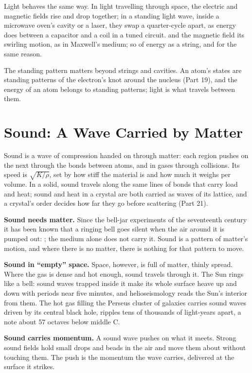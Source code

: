 Light behaves the same way. In light travelling through space, the electric and magnetic fields rise and drop together; in a standing light wave, inside a microwave oven's cavity or a laser, they swap a quarter-cycle apart, as energy does between a capacitor and a coil in a tuned circuit.  and the magnetic field its swirling motion, as in Maxwell's medium; so  of energy as a string, and for the same reason.

The standing pattern matters beyond strings and cavities. An atom's states are standing patterns of the electron's knot around the nucleus (Part 19), and the energy of an atom belongs to standing patterns; light is what travels between them.

\section{Sound: A Wave Carried by Matter}

Sound is a wave of compression handed on through matter: each region pushes on the next through the bonds between atoms, and in gases through collisions. Its speed is $\sqrt{K/\rho}$, set by how stiff the material is and how much it weighs per volume. In a solid, sound travels along the same lines of bonds that carry load and heat; sound and heat in a crystal are both carried as waves of its lattice, and a crystal's order decides how far they go before scattering (Part 21).

\textbf{Sound needs matter.} Since the bell-jar experiments of the seventeenth century it has been known that a ringing bell goes silent when the air around it is pumped out: ; the medium alone does not carry it. Sound is a pattern of matter's motion, and where there is no matter, there is nothing for that pattern to move.

\textbf{Sound in ``empty'' space.} Space, however, is full of matter, thinly spread. Where the gas is dense and hot enough, sound travels through it. The Sun rings like a bell: sound waves trapped inside it make its whole surface heave up and down with periods near five minutes, and helioseismology reads the Sun's interior from them. The hot gas filling the Perseus cluster of galaxies carries sound waves driven by its central black hole, ripples tens of thousands of light-years apart, a note about 57 octaves below middle C.

\textbf{Sound carries momentum.} A sound wave pushes on what it meets. Strong sound fields hold small drops and beads in the air and move them about without touching them. The push is the momentum the wave carries, delivered at the surface it strikes.

